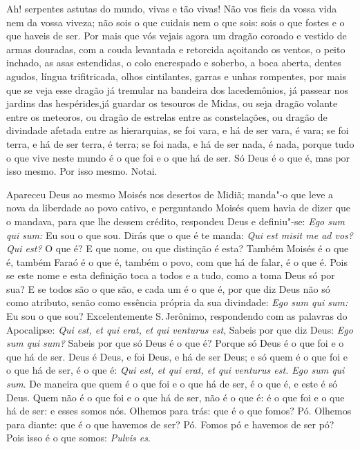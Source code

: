 Ah! serpentes astutas do mundo, vivas e tão vivas! Não vos fieis
da vossa vida nem da vossa viveza; não sois o que cuidais nem o que
sois: sois o que fostes e o que haveis de ser. Por mais que vós vejais
agora um dragão coroado e vestido de armas douradas, com a couda
levantada e retorcida açoitando os ventos, o peito inchado, as asas
estendidas, o colo encrespado e soberbo, a boca aberta, dentes
agudos, língua trifitricada, olhos cintilantes, garras e unhas
rompentes, por mais que se veja esse dragão já tremular na bandeira dos
lacedemônios, já passear nos jardins das hespérides,já guardar os
tesouros de Midas, ou seja dragão volante entre os meteoros, ou dragão
de estrelas entre as constelações, ou dragão de divindade afetada entre
as hierarquias, se foi vara, e há de ser vara, é vara; se foi terra, e
há de ser terra, é terra; se foi nada, e há de ser nada, é nada, porque
tudo o que vive neste mundo é o que foi e o que há de ser. Só Deus é o
que é, mas por isso mesmo. Por isso mesmo. Notai.

Apareceu Deus ao mesmo Moisés nos desertos de Midiã; manda"-o que leve a nova da liberdade ao povo cativo, e perguntando
Moisés quem havia de dizer que o mandava, para que lhe dessem crédito,
respondeu Deus e definiu"-se: \emph{Ego sum qui sum:} Eu sou o que sou. %
Dirás que o que é te manda: \emph{Qui est misit me ad vos?
Qui est?} O que é? E que nome, ou que distinção é esta? Também Moisés é
o que é, também Faraó é o que é, também o povo, com que há de falar, é o
que é. Pois se este nome e esta definição toca a todos e a tudo, como a
toma Deus só por sua? E se todos são o que são, e cada um é o que é, por
que diz Deus não só como atributo, senão como essência própria da sua
divindade: \emph{Ego sum qui sum:} Eu sou o que sou? Excelentemente S.\,Jerônimo, respondendo com as palavras do Apocalipse: \emph{Qui est, et
qui erat, et qui venturus est}, Sabeis por que diz Deus: \emph{Ego sum
qui sum?} Sabeis por que só Deus é o que é? Porque só Deus é o que foi e
o que há de ser. Deus é Deus, e foi Deus, e há de ser Deus; e só quem é
o que foi e o que há de ser, é o que é: \emph{Qui est, et qui erat, et
qui venturus est. Ego sum qui sum}. De maneira que quem é o que foi e o
que há de ser, é o que é, e este é só Deus. Quem não é o que foi e o que
há de ser, não é o que é: é o que foi e o que há de ser: e esses somos
nós. Olhemos para trás: que é o que fomos? Pó. Olhemos para diante: que
é o que havemos de ser? Pó. Fomos pó e havemos de ser pó? Pois isso é o
que somos: \emph{Pulvis es}.

